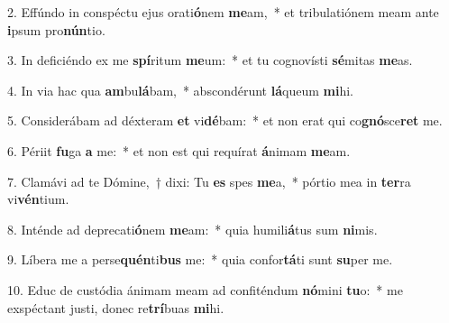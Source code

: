 \item 2. Effúndo in conspéctu ejus orati\textbf{ó}nem \textbf{me}am,~* et tribulatiónem meam ante \textbf{i}psum pro\textbf{nún}tio.
\item 3. In deficiéndo ex me \textbf{spí}ritum \textbf{me}um:~* et tu cognovísti \textbf{sé}mitas \textbf{me}as.
\item 4. In via hac qua \textbf{am}bu\textbf{lá}bam,~* abscondérunt \textbf{lá}queum \textbf{mi}hi.
\item 5. Considerábam ad déxteram \textbf{et} vi\textbf{dé}bam:~* et non erat qui co\textbf{gnó}sce\textbf{ret} me.
\item 6. Périit \textbf{fu}ga \textbf{a} me:~* et non est qui requírat \textbf{á}nimam \textbf{me}am.
\item 7. Clamávi ad te Dómine,~† dixi: Tu \textbf{es} spes \textbf{me}a,~* pórtio mea in \textbf{ter}ra vi\textbf{vén}tium.
\item 8. Inténde ad deprecati\textbf{ó}nem \textbf{me}am:~* quia humili\textbf{á}tus sum \textbf{ni}mis.
\item 9. Líbera me a perse\textbf{quén}ti\textbf{bus} me:~* quia confor\textbf{tá}ti sunt \textbf{su}per me.
\item 10. Educ de custódia ánimam meam ad confiténdum \textbf{nó}mini \textbf{tu}o:~* me exspéctant ju\-sti, donec re\textbf{trí}buas \textbf{mi}hi.
